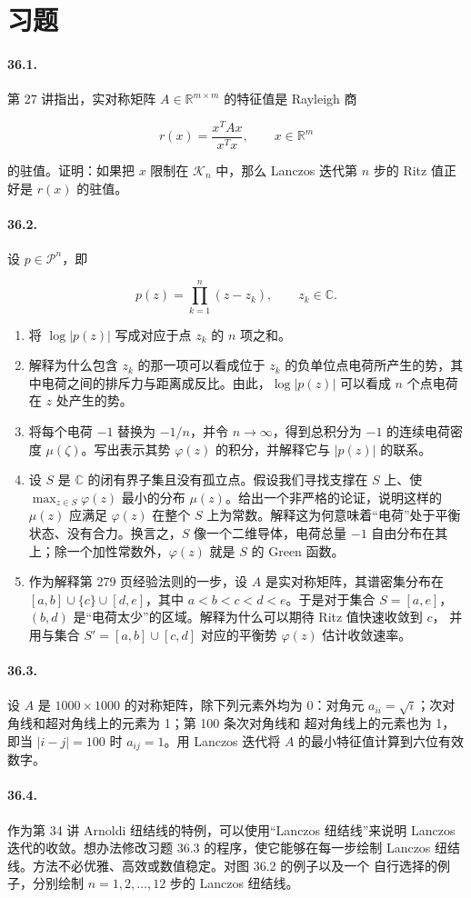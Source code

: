 \documentclass[UTF8,fontset=none,12pt]{ctexart}
\begin{document}
\section*{习题}

\paragraph{36.1.}
第 27 讲指出，实对称矩阵 $A\in\mathbb R^{m\times m}$ 的特征值是 Rayleigh
商

\[
r(x)=\frac{x^TAx}{x^Tx},\qquad x\in\mathbb R^m
\]

的驻值。证明：如果把 $x$ 限制在 $\mathcal K_n$ 中，那么 Lanczos 迭代第
$n$ 步的 Ritz 值正好是 $r(x)$ 的驻值。

\paragraph{36.2.}
设 $p\in\mathcal P^n$，即

\[
p(z)=\prod_{k=1}^n(z-z_k),\qquad z_k\in\mathbb C.
\]

\begin{enumerate}[label=(\alph*)]
\item 将 $\log|p(z)|$ 写成对应于点 $z_k$ 的 $n$ 项之和。
\item 解释为什么包含 $z_k$ 的那一项可以看成位于 $z_k$ 的负单位点电荷所产生的势，其中电荷之间的排斥力与距离成反比。由此，$\log|p(z)|$ 可以看成 $n$ 个点电荷在 $z$ 处产生的势。
\item 将每个电荷 $-1$ 替换为 $-1/n$，并令 $n\to\infty$，得到总积分为 $-1$ 的连续电荷密度 $\mu(\zeta)$。写出表示其势 $\varphi(z)$ 的积分，并解释它与 $|p(z)|$ 的联系。
\item 设 $S$ 是 $\mathbb C$ 的闭有界子集且没有孤立点。假设我们寻找支撑在 $S$ 上、使 $\max_{z\in S}\varphi(z)$ 最小的分布 $\mu(z)$。给出一个非严格的论证，说明这样的 $\mu(z)$ 应满足 $\varphi(z)$ 在整个 $S$ 上为常数。解释这为何意味着“电荷”处于平衡状态、没有合力。换言之，$S$ 像一个二维导体，电荷总量 $-1$ 自由分布在其上；除一个加性常数外，$\varphi(z)$ 就是 $S$ 的 Green 函数。
\item 作为解释第 279 页经验法则的一步，设 $A$ 是实对称矩阵，其谱密集分布在
$[a,b]\cup\{c\}\cup[d,e]$，其中 $a<b<c<d<e$。于是对于集合 $S=[a,e]$，
$(b,d)$ 是“电荷太少”的区域。解释为什么可以期待 Ritz 值快速收敛到 $c$，
并用与集合 $S'=[a,b]\cup[c,d]$ 对应的平衡势 $\varphi(z)$ 估计收敛速率。
\end{enumerate}

\paragraph{36.3.}
设 $A$ 是 $1000\times1000$ 的对称矩阵，除下列元素外均为 0：对角元
$a_{ii}=\sqrt{i}$；次对角线和超对角线上的元素为 1；第 100 条次对角线和
超对角线上的元素也为 1，即当 $|i-j|=100$ 时 $a_{ij}=1$。用 Lanczos
迭代将 $A$ 的最小特征值计算到六位有效数字。

\paragraph{36.4.}
作为第 34 讲 Arnoldi 纽结线的特例，可以使用“Lanczos 纽结线”来说明
Lanczos 迭代的收敛。想办法修改习题 36.3 的程序，使它能够在每一步绘制
Lanczos 纽结线。方法不必优雅、高效或数值稳定。对图 36.2 的例子以及一个
自行选择的例子，分别绘制 $n=1,2,\ldots,12$ 步的 Lanczos 纽结线。
\end{document}
